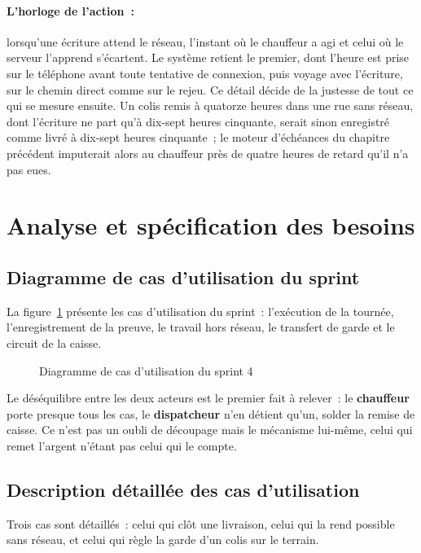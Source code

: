 \paragraph{L'horloge de l'action~:} lorsqu'une écriture attend le réseau, l'instant où le chauffeur a
agi et celui où le serveur l'apprend s'écartent. Le système retient le premier, dont l'heure est prise
sur le téléphone avant toute tentative de connexion, puis voyage avec l'écriture, sur le chemin
direct comme sur le rejeu. Ce détail décide de la justesse de tout ce qui se mesure ensuite. Un colis
remis à quatorze heures dans une rue sans réseau, dont l'écriture ne part qu'à dix-sept heures
cinquante, serait sinon enregistré comme livré à dix-sept heures cinquante~; le moteur d'échéances du
chapitre précédent imputerait alors au chauffeur près de quatre heures de retard qu'il n'a pas eues.

\section{Analyse et spécification des besoins}

\subsection{Diagramme de cas d'utilisation du sprint}

La figure~\ref{fig:uc-s4} présente les cas d'utilisation du sprint~: l'exécution de la tournée,
l'enregistrement de la preuve, le travail hors réseau, le transfert de garde et le circuit de la
caisse.

\begin{figure}[H]
\centering
{}
\caption{Diagramme de cas d'utilisation du sprint 4}
\label{fig:uc-s4}
\end{figure}

Le déséquilibre entre les deux acteurs est le premier fait à relever~: le \textbf{chauffeur} porte
presque tous les cas, le \textbf{dispatcheur} n'en détient qu'un, solder la remise de caisse. Ce
n'est pas un oubli de découpage mais le mécanisme lui-même, celui qui remet l'argent n'étant pas
celui qui le compte.

\subsection{Description détaillée des cas d'utilisation}

Trois cas sont détaillés~: celui qui clôt une livraison, celui qui la rend possible sans réseau, et
celui qui règle la garde d'un colis sur le terrain.


